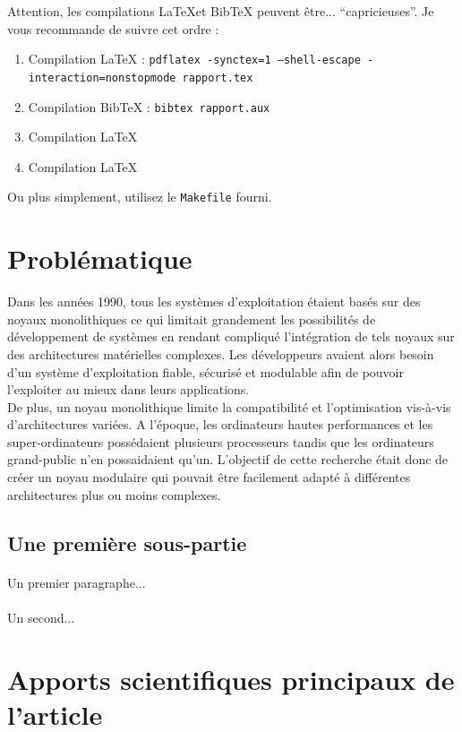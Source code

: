 \documentclass[a4paper, 12pt]{article}
\begin{document}
Attention, les compilations \LaTeX et BibTeX peuvent être... ``capricieuses''. Je vous recommande de suivre cet ordre :
\begin{enumerate}
\item Compilation \LaTeX{} : \texttt{pdflatex -synctex=1 --shell-escape -interaction=nonstopmode rapport.tex}
\item Compilation BibTeX : \texttt{bibtex rapport.aux}
\item Compilation \LaTeX{}
\item Compilation \LaTeX{}
\end{enumerate}
Ou plus simplement, utilisez le \texttt{Makefile} fourni.

\clearpage 
\section{Problématique}

Dans les années 1990, tous les systèmes d'exploitation étaient basés sur des noyaux monolithiques ce qui limitait grandement les possibilités de développement de systèmes en rendant compliqué l'intégration de tels noyaux sur des architectures matérielles complexes. Les développeurs avaient alors besoin d'un système d'exploitation fiable, sécurisé et modulable afin de pouvoir l'exploiter au mieux dans leurs applications. \\
De plus, un noyau monolithique limite la compatibilité et l'optimisation vis-à-vis d'architectures variées. A l'époque, les ordinateurs hautes performances et les super-ordinateurs possédaient plusieurs processeurs tandis que les ordinateurs grand-public n'en possaidaient qu'un. L'objectif de cette recherche était donc de créer un noyau modulaire qui pouvait être facilement adapté à différentes architectures plus ou moins complexes.

\subsection{Une première sous-partie}
\paragraph{}
Un premier paragraphe...
\paragraph{}
Un second...

\clearpage 
\section{Apports scientifiques principaux de l’article}
\end{document}
